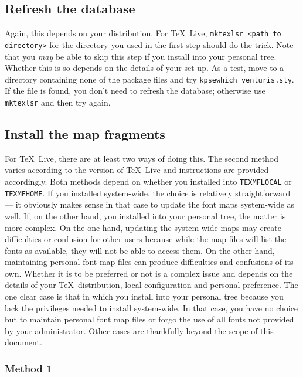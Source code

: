 \documentclass[11pt,british]{article}
\begin{document}
\subsection{Refresh the database}

Again, this depends on your distribution. For \TeX~Live, \verb|mktexlsr <path to directory>| for the directory you used in the first step should do the trick. Note that you \emph{may} be able to skip this step if you install into your personal tree. Whether this is so depends on the details of your set-up. As a test, move to a directory containing none of the package files and try \verb|kpsewhich venturis.sty|. If the file is found, you don't need to refresh the database; otherwise use \verb|mktexlsr| and then try again.

\subsection{Install the map fragments}

For \TeX~Live, there are at least two ways of doing this. The second method varies according to the version of \TeX~Live and instructions are provided accordingly. Both methods depend on whether you installed into \verb|TEXMFLOCAL| or \verb|TEXMFHOME|. If you installed system-wide, the choice is relatively straightforward --- it obviously makes sense in that case to update the font maps system-wide as well. If, on the other hand, you installed into your personal tree, the matter is more complex. On the one hand, updating the system-wide maps may create difficulties or confusion for other users because while the map files will list the fonts as available, they will not be able to access them. On the other hand, maintaining personal font map files can produce difficulties and confusions of its own. Whether it is to be preferred or not is a complex issue and depends on the details of your \TeX\ distribution, local configuration and personal preference. The one clear case is that in which you install into your personal tree because you lack the privileges needed to install system-wide. In that case, you have no choice but to maintain personal font map files or forgo the use of all fonts not provided by your administrator. Other cases are thankfully beyond the scope of this document.

\subsubsection{Method 1}
\end{document}
